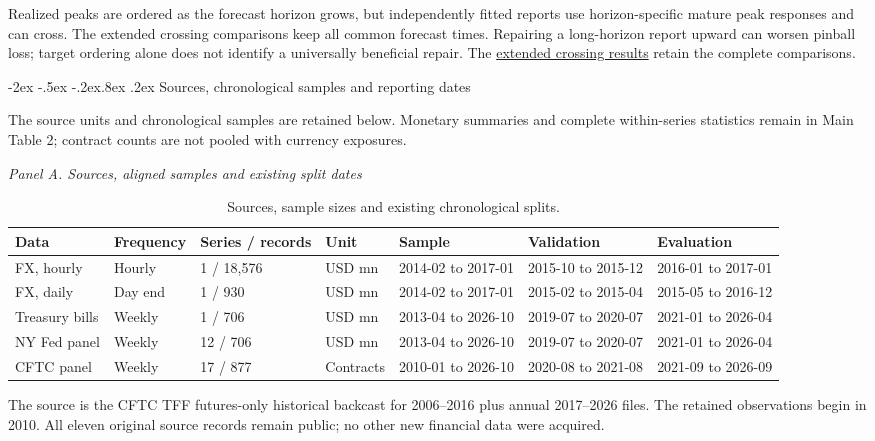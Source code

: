 \documentclass[12pt,a4paper]{article}
\makeatletter
\renewcommand\section{\@startsection{section}{1}{\z@}%
  {-2ex \@plus -.5ex \@minus -.2ex}{.8ex \@plus .2ex}%
  {\normalfont\large\bfseries}}
\makeatother
\begin{document}
Realized peaks are ordered as the forecast horizon grows, but
independently fitted reports use horizon-specific mature peak responses and can
cross. The extended crossing comparisons keep all common forecast times.
Repairing a long-horizon report upward can worsen pinball loss; target ordering
alone does not identify a universally beneficial repair.
The \href{https://github.com/ByronLi0207/financial-mathematics-paper-20261020/blob/submission-final/EXTENDED_RESULTS.md#asmbi-extended-s22}{extended crossing results} retain the complete comparisons.

\FloatBarrier


\section{Sources, chronological samples and reporting dates}\label{sup:v10-cftc}

The source units and chronological samples are retained below. Monetary summaries and complete within-series statistics remain in Main Table 2; contract counts are not pooled with currency exposures.
\begin{table}[htbp]\centering
\caption{Sources, sample sizes and existing chronological splits.}\label{tab:supplement-data}
\begingroup\fontsize{7.5}{9}\selectfont\setlength{\tabcolsep}{2pt}
\textit{Panel A. Sources, aligned samples and existing split dates}\\[3pt]
\begin{tabular}{@{}lllllll@{}}
\toprule
Data & Frequency & Series / records & Unit & Sample & Validation & Evaluation \\
\midrule
FX, hourly & Hourly & 1 / 18,576 & USD mn & 2014-02 to 2017-01 & 2015-10 to 2015-12 & 2016-01 to 2017-01 \\
FX, daily & Day end & 1 / 930 & USD mn & 2014-02 to 2017-01 & 2015-02 to 2015-04 & 2015-05 to 2016-12 \\
Treasury bills & Weekly & 1 / 706 & USD mn & 2013-04 to 2026-10 & 2019-07 to 2020-07 & 2021-01 to 2026-04 \\
NY Fed panel & Weekly & 12 / 706 & USD mn & 2013-04 to 2026-10 & 2019-07 to 2020-07 & 2021-01 to 2026-04 \\
CFTC panel & Weekly & 17 / 877 & Contracts & 2010-01 to 2026-10 & 2020-08 to 2021-08 & 2021-09 to 2026-09 \\
\bottomrule
\end{tabular}
\endgroup\end{table}

The source is the CFTC TFF futures-only historical backcast for 2006--2016 plus annual 2017--2026 files. The retained observations begin in 2010. All eleven original source records remain public; no other new financial data were acquired.
\end{document}
